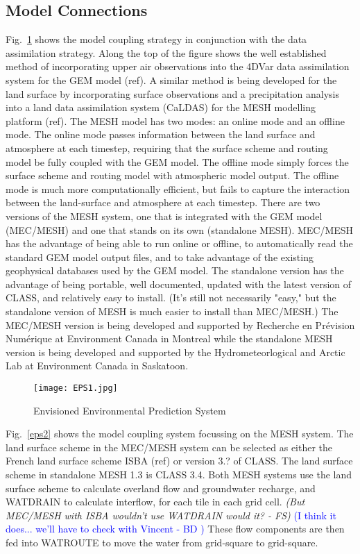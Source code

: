 \documentclass[hess]{copernicus}
\begin{document}
\subsection{Model Connections} %
Fig.~\ref{eps1} shows the model coupling strategy in conjunction with the data assimilation strategy. Along the top of the figure shows the well established method of incorporating upper air observations into the 4DVar data assimilation system for the GEM model (ref). A similar method is being developed for the land surface by incorporating surface observations and a precipitation analysis into a land data assimilation system (CaLDAS) for the MESH modelling platform (ref). The MESH model has two modes: an online mode and an offline mode. The online mode passes information between the land surface and atmosphere at each timestep, requiring that the surface scheme and routing model be fully coupled with the GEM model. The offline mode simply forces the surface scheme and routing model with atmospheric model output. The offline mode is much more computationally efficient, but fails to capture the interaction between the land-surface and atmosphere at each timestep. There are two versions of the MESH system, one that is integrated with the GEM model (MEC/MESH) and one that stands on its own (standalone MESH). MEC/MESH has the advantage of being able to run online or offline, to automatically read the standard GEM model output files, and to take advantage of the existing geophysical databases used by the GEM model. The standalone version has the advantage of being portable, well documented, updated with the latest version of CLASS, and relatively easy to install. (It's still not necessarily "easy," but the standalone version of MESH is much easier to install than MEC/MESH.) The MEC/MESH version is being developed and supported by Recherche en  Pr\'{e}vision Num\'{e}rique at Environment Canada in Montreal while the standalone MESH version is being developed and supported by the Hydrometeorlogical and Arctic Lab at Environment Canada in Saskatoon.

\begin{figure}[h!]
\vspace*{2mm}
\begin{center}
\texttt{[image: EPS1.jpg]}
\end{center}
\caption{Envisioned Environmental Prediction System}
\label{eps1}
\end{figure}

Fig.~\ref{eps2} shows the model coupling system focussing on the MESH system. The land surface scheme in the MEC/MESH system can be selected as either the French land surface scheme ISBA (ref) or version 3.? of CLASS. The land surface scheme in standalone MESH 1.3 is CLASS 3.4. Both MESH systems use the land surface scheme to calculate overland flow and groundwater recharge, and WATDRAIN to calculate interflow, for each tile in each grid cell. {\em (But MEC/MESH with ISBA wouldn't use WATDRAIN would it? - FS)}\textcolor{blue}{ (I think it does... we'll have to check with Vincent - BD ) }These flow components are then fed into WATROUTE to move the water from grid-square to grid-square.
\end{document}
